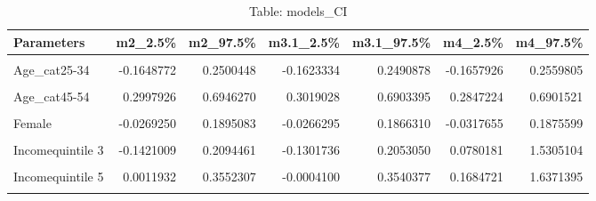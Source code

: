 \begin{table}
\centering
\caption{Table:  models_CI}
\centering
\fontsize{10}{12}\selectfont
\begin{tabular}[t]{lrrrrrr}
\toprule
Parameters & m2\_2.5\% & m2\_97.5\% & m3.1\_2.5\% & m3.1\_97.5\% & m4\_2.5\% & m4\_97.5\%\\
\midrule
\cellcolor{gray!10}{(Intercept)} & \cellcolor{gray!10}{-3.7742993} & \cellcolor{gray!10}{-1.3749809} & \cellcolor{gray!10}{-3.3807354} & \cellcolor{gray!10}{-1.8598898} & \cellcolor{gray!10}{-4.1273624} & \cellcolor{gray!10}{-2.1886292}\\
Age\_cat25-34 & -0.1648772 & 0.2500448 & -0.1623334 & 0.2490878 & -0.1657926 & 0.2559805\\
\cellcolor{gray!10}{Age\_cat35-44} & \cellcolor{gray!10}{0.0574747} & \cellcolor{gray!10}{0.4662693} & \cellcolor{gray!10}{0.0518361} & \cellcolor{gray!10}{0.4543832} & \cellcolor{gray!10}{0.0460426} & \cellcolor{gray!10}{0.4646960}\\
Age\_cat45-54 & 0.2997926 & 0.6946270 & 0.3019028 & 0.6903395 & 0.2847224 & 0.6901521\\
\cellcolor{gray!10}{Age\_cat55+} & \cellcolor{gray!10}{0.7888174} & \cellcolor{gray!10}{1.1294998} & \cellcolor{gray!10}{0.7820319} & \cellcolor{gray!10}{1.1318816} & \cellcolor{gray!10}{0.7867250} & \cellcolor{gray!10}{1.1377855}\\
\addlinespace
Female & -0.0269250 & 0.1895083 & -0.0266295 & 0.1866310 & -0.0317655 & 0.1875599\\
\cellcolor{gray!10}{Incomequintile 2} & \cellcolor{gray!10}{-0.2063756} & \cellcolor{gray!10}{0.1521080} & \cellcolor{gray!10}{-0.2051901} & \cellcolor{gray!10}{0.1393005} & \cellcolor{gray!10}{-0.6977356} & \cellcolor{gray!10}{0.8294100}\\
Incomequintile 3 & -0.1421009 & 0.2094461 & -0.1301736 & 0.2053050 & 0.0780181 & 1.5305104\\
\cellcolor{gray!10}{Incomequintile 4} & \cellcolor{gray!10}{-0.0385204} & \cellcolor{gray!10}{0.3021460} & \cellcolor{gray!10}{-0.0445209} & \cellcolor{gray!10}{0.3005113} & \cellcolor{gray!10}{0.1876658} & \cellcolor{gray!10}{1.6509306}\\
Incomequintile 5 & 0.0011932 & 0.3552307 & -0.0004100 & 0.3540377 & 0.1684721 & 1.6371395\\
\addlinespace
\cellcolor{gray!10}{Higher\_edu} & \cellcolor{gray!10}{0.0187005} & \cellcolor{gray!10}{0.2459318} & \cellcolor{gray!10}{0.0185529} & \cellcolor{gray!10}{0.2477644} & \cellcolor{gray!10}{0.0153640} & \cellcolor{gray!10}{0.2447508}\\

\end{tabular}
\end{table}
